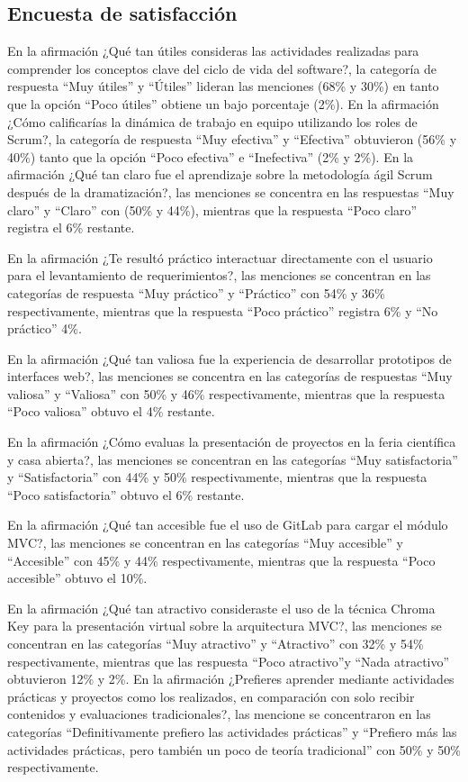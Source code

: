 \documentclass[12pt]{article}
\begin{document}
\begin{multicols}{2}
\subsection{Encuesta de satisfacción}
\label{sec:encu-de-satisf}

En la afirmación ¿Qué tan útiles consideras las actividades realizadas para comprender los conceptos clave del ciclo de vida del software?, la categoría de respuesta ``Muy útiles'' y ``Útiles'' lideran las menciones (68\% y 30\%) en tanto que la opción ``Poco útiles'' obtiene un bajo porcentaje (2\%).
En la afirmación ¿Cómo calificarías la dinámica de trabajo en equipo utilizando los roles de Scrum?, la categoría de respuesta ``Muy efectiva'' y ``Efectiva'' obtuvieron (56\% y 40\%) tanto que la opción ``Poco efectiva'' e ``Inefectiva'' (2\% y 2\%).
En la afirmación ¿Qué tan claro fue el aprendizaje sobre la metodología ágil Scrum después de la dramatización?, las menciones se concentra en las respuestas ``Muy claro'' y ``Claro'' con (50\% y 44\%), mientras que la respuesta ``Poco claro'' registra el 6\% restante.

En la afirmación ¿Te resultó práctico interactuar directamente con el usuario para el levantamiento de requerimientos?, las menciones se concentran en las categorías de respuesta ``Muy práctico'' y ``Práctico'' con 54\% y 36\% respectivamente, mientras que la respuesta ``Poco práctico'' registra 6\% y ``No práctico'' 4\%.

En la afirmación ¿Qué tan valiosa fue la experiencia de desarrollar prototipos de interfaces web?, las menciones se concentra en las categorías de respuestas ``Muy valiosa'' y ``Valiosa'' con 50\% y 46\% respectivamente, mientras que la respuesta ``Poco valiosa'' obtuvo el 4\% restante.

En la afirmación ¿Cómo evaluas la presentación de proyectos en la feria científica y casa abierta?, las menciones se concentran en las categorías ``Muy satisfactoria'' y ``Satisfactoria'' con 44\% y 50\% respectivamente, mientras que la respuesta ``Poco satisfactoria'' obtuvo el 6\% restante.

En la afirmación ¿Qué tan accesible fue el uso de GitLab para cargar el módulo MVC?, las menciones se concentran en las categorías ``Muy accesible'' y ``Accesible'' con 45\% y 44\% respectivamente, mientras que la respuesta ``Poco accesible'' obtuvo el 10\%.

En la afirmación ¿Qué tan atractivo consideraste el uso de la técnica Chroma Key para la presentación virtual sobre la arquitectura MVC?, las menciones se concentran en las categorías ``Muy atractivo'' y ``Atractivo'' con 32\% y 54\% respectivamente, mientras que las respuesta ``Poco atractivo''y ``Nada atractivo'' obtuvieron 12\% y 2\%.
En la afirmación ¿Prefieres aprender mediante actividades prácticas y proyectos como los realizados, en comparación con solo recibir contenidos y evaluaciones tradicionales?, las mencione se concentraron en las categorías ``Definitivamente prefiero las actividades prácticas'' y ``Prefiero más las actividades prácticas, pero también un poco de teoría tradicional'' con 50\% y 50\% respectivamente.


\end{multicols}
\end{document}
